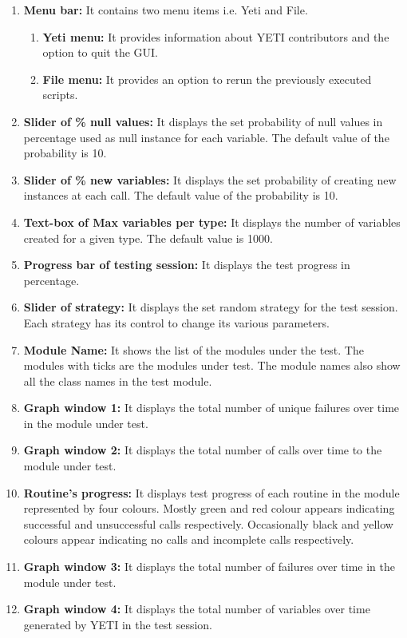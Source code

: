 \begin{enumerate}

\item \textbf{Menu bar:} It contains two menu items i.e. Yeti and File.
\begin{enumerate}
\item \textbf{Yeti menu:} It provides information about YETI contributors and the option to quit the GUI.
\item \textbf{File menu:} It provides an option to rerun the previously executed scripts.
\end{enumerate}
\item \textbf{Slider of \% null values:} It displays the set probability of null values in percentage used as null instance for each variable. The default value of the probability is 10. 
\item \textbf{Slider of \% new variables:} It displays the set probability of creating new instances at each call. The default value of the probability is 10. 
\item \textbf{Text-box of Max variables per type:} It displays the number of variables created for a given type. The default value is 1000.
\item \textbf{Progress bar of testing session:} It displays the test progress in percentage.
\item \textbf{Slider of strategy:} It displays the set random strategy for the test session. Each strategy has its control to change its various parameters. 
\item \textbf{Module Name:} It shows the list of the modules under the test. The
modules with ticks are the modules under test. The module names also show all the
class names in the test module.
\item \textbf{Graph window 1:} It displays the total number of unique failures over time in the module under test.
\item \textbf{Graph window 2:} It displays the total number of calls over time to the module under test.
\item \textbf{Routine's progress:} It displays test progress of each routine in the module represented by four colours. Mostly green and red colour appears indicating successful and unsuccessful calls respectively. Occasionally black and yellow colours appear indicating no calls and incomplete calls respectively.
\item \textbf{Graph window 3:} It displays the total number of failures over time in the module under test. 
\item \textbf{Graph window 4:} It displays the total number of variables over time generated by YETI in the test session.

\end{enumerate}
